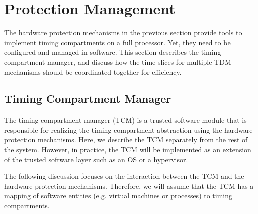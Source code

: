 \section{Protection Management}

The hardware protection mechanisms in the previous section provide tools
to implement timing compartments on a full processor. Yet, they need to be
configured and managed in software. 
This section describes the timing compartment manager, 
and discuss how the time slices for multiple TDM mechanisms should be
coordinated together for efficiency.

\subsection{Timing Compartment Manager}
\label{sec:integration_tcm}

The timing compartment manager (TCM) is a trusted software module that is
responsible for realizing the timing compartment abstraction using the
hardware protection mechanisms.
Here, we describe the TCM separately from the rest of the system.
However, in practice, the TCM will be implemented as an extension of the trusted software
layer such as an OS or a hypervisor.

The following discussion focuses on the interaction between the TCM and the 
hardware
protection mechanisms. Therefore, we will assume that the TCM has
a mapping of software entities (e.g. virtual machines or processes) to timing 
compartments.


